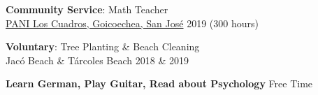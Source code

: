     \begin{tcolorbox}[title=Extra Curricular Activities \faUserPlus,colframe=blue!25!black]
        
        \textbf{Community Service}: Math Teacher\\
        \faMapMarker \hspace{0mm} \href{https://pani.go.cr/}{PANI Los Cuadros, Goicoechea, San José} \hspace{8.15cm} \faCalendar \hspace{0mm} 2019 (300 hours)
        
        \tcbline
        
        \textbf{Voluntary}: Tree Planting \& Beach Cleaning \\
        \faMapMarker \hspace{0mm} Jacó Beach \& Tárcoles Beach  \hspace{9.9cm} \faCalendar \hspace{0mm} 2018 \& 2019
        \tcbline  
        
        \textbf{Learn German, Play Guitar, Read about Psychology} \hspace{5.5cm} \faClock[regular] \hspace{0mm} Free Time
        
    \end{tcolorbox}
    